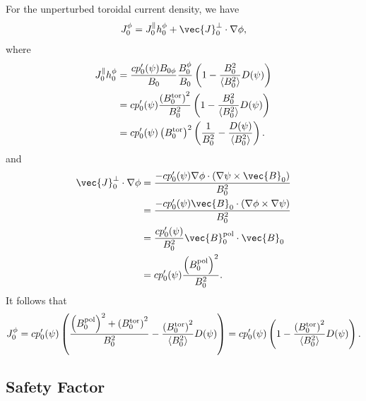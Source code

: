 For the unperturbed toroidal current density, we have
\begin{gather}
  J_{0}^{\phi} = J_{0}^{\parallel} h_{0}^{\phi} + \vec{J}_{0}^{\perp} \cdot \grad \phi,
\end{gather}
where
\begin{align}
  J_{0}^{\parallel} h_{0}^{\phi} &= \frac{c p_{0}'(\psi) B_{0 \phi}}{B_{0}} \frac{B_{0}^{\phi}}{B_{0}} \left( 1 - \frac{B_{0}^{2}}{\left\langle B_{0}^{2} \right\rangle} D(\psi) \right) \nonumber \\
  &= c p_{0}'(\psi) \frac{\left( B_{0}^{\tor} \right)^{2}}{B_0^2} \left( 1 - \frac{B_{0}^{2}}{\left\langle B_{0}^{2} \right\rangle} D(\psi) \right) \nonumber \\
  &= c p_{0}'(\psi) \left( B_{0}^{\tor} \right)^{2} \left( \frac{1}{B_{0}^{2}} - \frac{D(\psi)}{\left\langle B_{0}^{2} \right\rangle} \right).
\end{align}
and
\begin{align}
  \vec{J}_{0}^{\perp} \cdot \grad \phi &= \frac{-c p_{0}'(\psi) \grad \phi \cdot (\grad \psi \times \vec{B}_{0})}{B_{0}^{2}} \nonumber \\
  &= \frac{-c p_{0}'(\psi) \vec{B}_{0} \cdot (\grad \phi \times \grad \psi)}{B_{0}^{2}} \\
  &= \frac{c p_{0}'(\psi)}{B_{0}^{2}} \vec{B}_{0}^{\pol} \cdot \vec{B}_{0} \nonumber \\
  &= c p_{0}'(\psi) \frac{\left( B_{0}^{\pol} \right)^{2}}{B_{0}^{2}}.
\end{align}
It follows that
\begin{gather}
  J_{0}^{\phi} = c p_{0}'(\psi) \left( \frac{\left( B_{0}^{\pol} \right)^{2} + \left( B_{0}^{\tor} \right)^{2}}{B_{0}^{2}} - \frac{\left( B_{0}^{\tor} \right)^{2}}{\left\langle B_{0}^{2} \right\rangle} D(\psi)\right) = c p_{0}'(\psi) \left( 1 - \frac{\left( B_{0}^{\tor} \right)^{2}}{\left\langle B_{0}^{2} \right\rangle} D(\psi)\right).
\end{gather}

\subsection{Safety Factor}
\label{sec:safety_factor}

